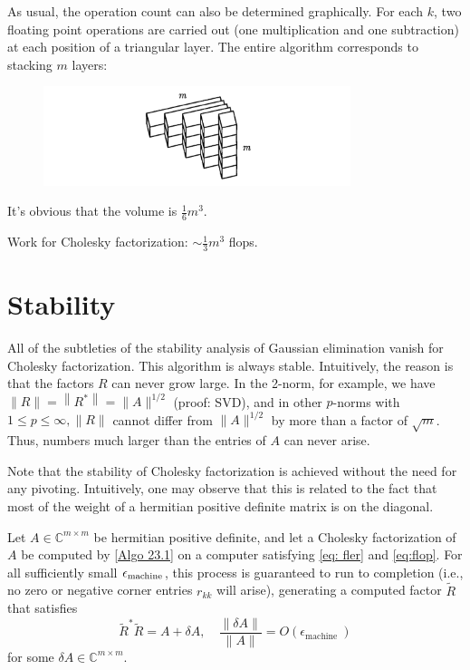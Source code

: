As usual, the operation count can also be determined graphically. For each $k$, two floating point operations are carried out (one multiplication and one subtraction) at each position of a triangular layer. The entire algorithm corresponds to stacking $m$ layers:
\begin{figure}[H]
    \centering
    \includegraphics[width=0.8\textwidth]{figures/23-1.png}
\end{figure}

It's obvious that the volume is $\frac{1}{6}m^3$. 


\begin{corollary}
\label{cor: Work for cholesky factor}
Work for Cholesky factorization: $ \sim \frac{1}{3}m^3 $ flops. 
\end{corollary}

\section{Stability}
All of the subtleties of the stability analysis of Gaussian elimination vanish for Cholesky factorization. This algorithm is always stable. Intuitively, the reason is that the factors $R$ can never grow large. In the 2-norm, for example, we have $\|R\|=\left\|R^*\right\|=\|A\|^{1 / 2}$ (proof: SVD), and in other $p$-norms with $1 \leq p \leq \infty,\|R\|$ cannot differ from $\|A\|^{1 / 2}$ by more than a factor of $\sqrt{m}$. Thus, numbers much larger than the entries of $A$ can never arise.

Note that the stability of Cholesky factorization is achieved without the need for any pivoting. Intuitively, one may observe that this is related to the fact that most of the weight of a hermitian positive definite matrix is on the diagonal.

\begin{theorem}
\label{thm: Backstap of Cholesky}
Let $A \in \mathbb{C}^{m \times m}$ be hermitian positive definite, and let a Cholesky factorization of $A$ be computed by \autoref{Algo 23.1} on a computer satisfying \eqref{eq: fler} and \eqref{eq:flop}. For all sufficiently small $\epsilon_{\text{machine}}$, this process is guaranteed to run to completion (i.e., no zero or negative corner entries $r_{k k}$ will arise), generating a computed factor $\tilde{R}$ that satisfies
\begin{equation}
\label{eq: Backstap of Cholesky}
\tilde{R}^* \tilde{R}=A+\delta A, \quad \frac{\|\delta A\|}{\|A\|}=O\left(\epsilon_{\text {machine }}\right)
\end{equation}
for some $\delta A \in \mathbb{C}^{m \times m}$.
\end{theorem}


